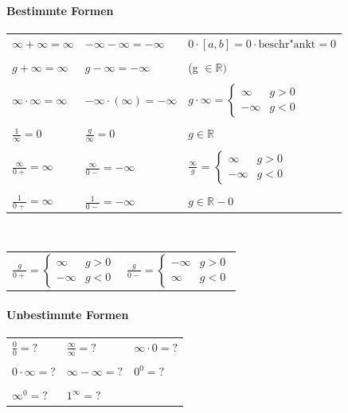 				\paragraph{Bestimmte Formen}
				\begin{tabular}{lll}
				$\infty + \infty = \infty$ & $-\infty - \infty = -\infty$ & $0 \cdot [a,b] = 0 \cdot \text{beschr"ankt} = 0$ \\
				\\
				$g + \infty = \infty$ & $g - \infty = -\infty$ & 	(g $\in \mathbb{R})$ \\
				\\ 
				$\infty \cdot \infty = \infty$ &	$-\infty \cdot (\infty) = -\infty$ & $g \cdot \infty = \begin{cases}
											\infty & g > 0 \\ 
											-\infty & g < 0 
											\end{cases}$\\ 		
				\\
				$\frac{1}{\infty} = 0$ &	$\frac{g}{\infty} = 0$ & 	$g \in \mathbb{R}$	\\
				\\
				$\frac{\infty}{0+} = \infty$	& $\frac{\infty}{0-} = -\infty$	& $\frac{\infty}{g}$ = 	$\begin{cases}			
										\infty & g > 0 \\
										-\infty & g < 0
										\end{cases} $ \\
				\\
				$\frac{1}{0+} = \infty$ & $\frac{1}{0-} = -\infty$	 & $g \in \mathbb{R} - {0}$\\
				\end{tabular}
				\\
				\begin{tabular}{ll}
				$\frac{g}{0+} = 	\begin{cases}					
								\infty & g > 0 \\
								-\infty & g < 0
								\end{cases} $ &
				$\frac{g}{0-} = 	\begin{cases}				
								-\infty & g > 0 \\
								\infty & g < 0
								\end{cases}$ \\ 
				\end{tabular}
				

				\paragraph{Unbestimmte Formen}
				\begin{tabular}{lll}
				$\frac{0}{0} = ?$ & $\frac{\infty}{\infty} = ?$ & $\infty \cdot 0 = ?$ \\
				\\
				$0 \cdot \infty = ?$ & $\infty - \infty = ?$ & $0^0 = ?$ \\
				\\
				$\infty^0 = ?$ & $1^{\infty} = ?$ & \\
	
				\end{tabular}
			
